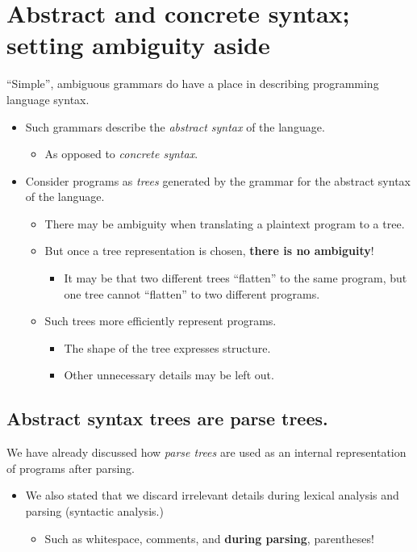 \documentclass[11pt]{article}
\theoremstyle{definition}
\begin{document}
\section{Abstract and concrete syntax; setting ambiguity aside}
\label{sec:org82e4bfd}
“Simple”, ambiguous grammars do have a place in describing
programming language syntax.
\begin{itemize}
\item Such grammars describe the \emph{abstract syntax} of the language.
\begin{itemize}
\item As opposed to \emph{concrete syntax}.
\end{itemize}
\item Consider programs as \emph{trees} generated by the grammar
for the abstract syntax of the language.
\begin{itemize}
\item There may be ambiguity when translating a plaintext program to a tree.
\item But once a tree representation is chosen,
\textbf{there is no ambiguity}!
\begin{itemize}
\item It may be that two different trees “flatten” to the same program,
but one tree cannot “flatten” to two different programs.
\end{itemize}
\item Such trees more efficiently represent programs.
\begin{itemize}
\item The shape of the tree expresses structure.
\item Other unnecessary details may be left out.
\end{itemize}
\end{itemize}
\end{itemize}

\subsection{Abstract syntax trees are parse trees.}
\label{sec:orgf3f4748}

We have already discussed how \emph{parse trees} are used
as an internal representation of programs
after parsing.
\begin{itemize}
\item We also stated that we discard irrelevant details during
lexical analysis and parsing (syntactic analysis.)
\begin{itemize}
\item Such as whitespace, comments, and \textbf{during parsing}, parentheses!
\end{itemize}
\end{itemize}
\end{document}
